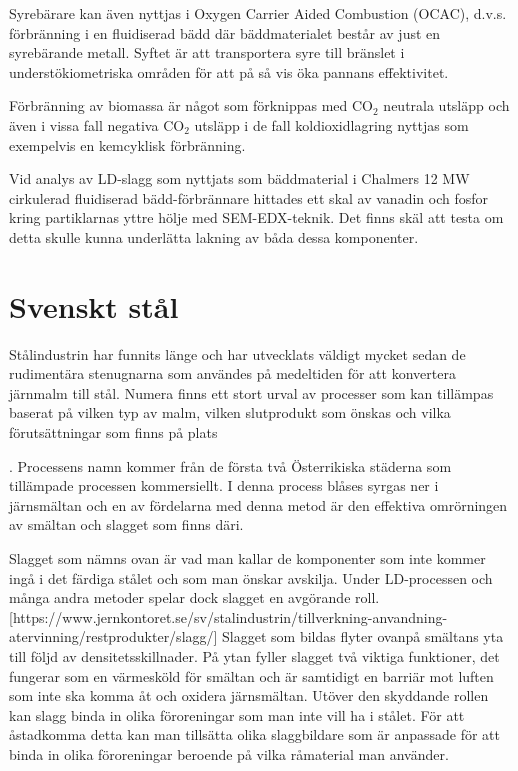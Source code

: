 Syrebärare kan även nyttjas i Oxygen Carrier Aided Combustion (OCAC), d.v.s. förbränning i en fluidiserad bädd där bäddmaterialet består av just en syrebärande metall.
Syftet är att transportera syre till bränslet i understökiometriska områden för att på så vis öka pannans effektivitet\cite{Zevenhoven2018}.
 
 Förbränning av biomassa är något som förknippas med CO$_2$ neutrala utsläpp och även i vissa fall negativa CO$_2$ utsläpp i de fall koldioxidlagring nyttjas som exempelvis en kemcyklisk förbränning\cite{Zevenhoven2018}.

Vid analys av LD-slagg som nyttjats som bäddmaterial i Chalmers 12 MW cirkulerad fluidiserad bädd-förbrännare hittades ett skal av vanadin och fosfor kring partiklarnas yttre hölje med SEM-EDX-teknik. Det finns skäl att testa om detta skulle kunna underlätta lakning av båda dessa komponenter.


\section{Svenskt stål}
Stålindustrin har funnits länge och har utvecklats väldigt mycket sedan de rudimentära stenugnarna som användes på medeltiden för att konvertera järnmalm till stål. Numera finns ett stort urval av processer som kan tillämpas baserat på vilken typ av malm, vilken slutprodukt som önskas och vilka förutsättningar som finns på plats \cite{Pehlke2014b}

\cite{Jernkontoret2000}. %
Processens namn kommer från de första två Österrikiska städerna som tillämpade processen kommersiellt. I denna process blåses syrgas ner i järnsmältan och en av fördelarna med denna metod är den effektiva omrörningen av smältan och slagget som finns däri.

Slagget som nämns ovan är vad man kallar de komponenter som inte kommer ingå i det färdiga stålet och som man önskar avskilja. Under LD-processen och många andra metoder spelar dock slagget en avgörande roll. [https://www.jernkontoret.se/sv/stalindustrin/tillverkning-anvandning-atervinning/restprodukter/slagg/]
Slagget som bildas flyter ovanpå smältans yta till följd av densitetsskillnader. På ytan fyller slagget två viktiga funktioner, det fungerar som en värmesköld för smältan och är samtidigt en barriär mot luften som inte ska komma åt och oxidera järnsmältan. Utöver den skyddande rollen kan slagg binda in olika föroreningar som man inte vill ha i stålet. För att åstadkomma detta kan man tillsätta olika slaggbildare som är anpassade för att binda in olika föroreningar beroende på vilka råmaterial man använder. 

